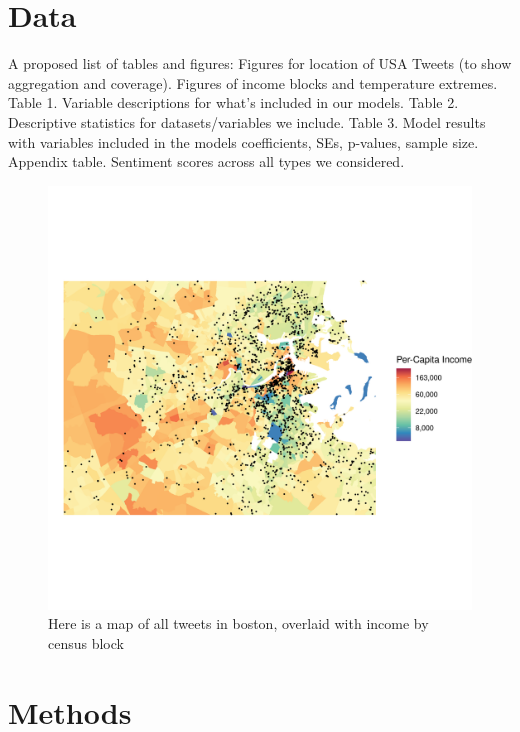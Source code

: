 \documentclass{article}
\begin{document}
\section{Data}
A proposed list of tables and figures:
Figures for location of USA Tweets (to show aggregation and coverage).
Figures of income blocks and temperature extremes.
Table 1. Variable descriptions for what's included in our models.
Table 2. Descriptive statistics for datasets/variables we include.
Table 3. Model results with variables included in the models coefficients, SEs, p-values, sample size.
Appendix table. Sentiment scores across all types we considered.
\begin{figure}[H]
  \centering
  \includegraphics[width=\linewidth]{../res/Boston_Map.png}
  \caption{Here is a map of all tweets in boston, overlaid with income by census block}
  \label{fig:timeseries}
\end{figure}

\section{Methods}
\end{document}
